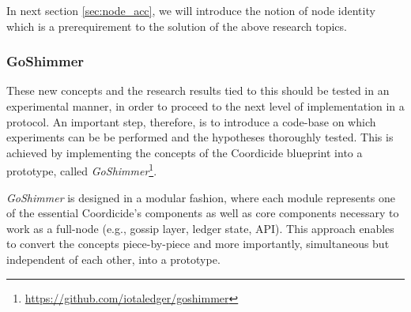 \documentclass[../main.tex]{subfiles}
\begin{document}
In next section \ref{sec:node_acc}, we will introduce the notion of node identity which is a prerequirement to the solution of the above research topics.

	
\subsubsection{GoShimmer}

These new concepts and the research results tied to this should be tested in an experimental manner, in order to proceed to the next level of implementation in a protocol. An important step, therefore, is to introduce a code-base on which experiments can be be performed and the hypotheses thoroughly tested. This is achieved by implementing the concepts of the Coordicide blueprint into a prototype, called \emph{GoShimmer}\footnote{\url{https://github.com/iotaledger/goshimmer}}.

\emph{GoShimmer} is designed in a modular fashion, where each module represents one of the essential Coordicide's components as well as core components necessary to work as a full-node (e.g., gossip layer, ledger state, API). This approach enables to convert the concepts piece-by-piece and more importantly, simultaneous but independent of each other, into a prototype.
	
\end{document}
